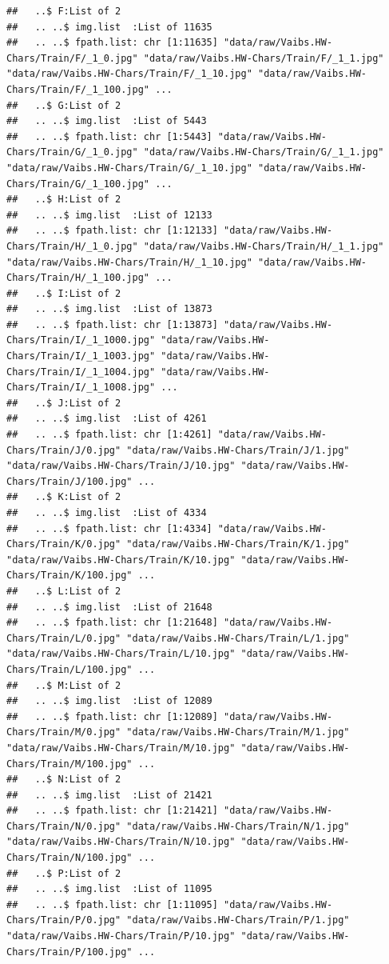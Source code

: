 \documentclass[
]{report}
\begin{document}
\begin{verbatim}
##   ..$ F:List of 2
##   .. ..$ img.list  :List of 11635
##   .. ..$ fpath.list: chr [1:11635] "data/raw/Vaibs.HW-Chars/Train/F/_1_0.jpg" "data/raw/Vaibs.HW-Chars/Train/F/_1_1.jpg" "data/raw/Vaibs.HW-Chars/Train/F/_1_10.jpg" "data/raw/Vaibs.HW-Chars/Train/F/_1_100.jpg" ...
##   ..$ G:List of 2
##   .. ..$ img.list  :List of 5443
##   .. ..$ fpath.list: chr [1:5443] "data/raw/Vaibs.HW-Chars/Train/G/_1_0.jpg" "data/raw/Vaibs.HW-Chars/Train/G/_1_1.jpg" "data/raw/Vaibs.HW-Chars/Train/G/_1_10.jpg" "data/raw/Vaibs.HW-Chars/Train/G/_1_100.jpg" ...
##   ..$ H:List of 2
##   .. ..$ img.list  :List of 12133
##   .. ..$ fpath.list: chr [1:12133] "data/raw/Vaibs.HW-Chars/Train/H/_1_0.jpg" "data/raw/Vaibs.HW-Chars/Train/H/_1_1.jpg" "data/raw/Vaibs.HW-Chars/Train/H/_1_10.jpg" "data/raw/Vaibs.HW-Chars/Train/H/_1_100.jpg" ...
##   ..$ I:List of 2
##   .. ..$ img.list  :List of 13873
##   .. ..$ fpath.list: chr [1:13873] "data/raw/Vaibs.HW-Chars/Train/I/_1_1000.jpg" "data/raw/Vaibs.HW-Chars/Train/I/_1_1003.jpg" "data/raw/Vaibs.HW-Chars/Train/I/_1_1004.jpg" "data/raw/Vaibs.HW-Chars/Train/I/_1_1008.jpg" ...
##   ..$ J:List of 2
##   .. ..$ img.list  :List of 4261
##   .. ..$ fpath.list: chr [1:4261] "data/raw/Vaibs.HW-Chars/Train/J/0.jpg" "data/raw/Vaibs.HW-Chars/Train/J/1.jpg" "data/raw/Vaibs.HW-Chars/Train/J/10.jpg" "data/raw/Vaibs.HW-Chars/Train/J/100.jpg" ...
##   ..$ K:List of 2
##   .. ..$ img.list  :List of 4334
##   .. ..$ fpath.list: chr [1:4334] "data/raw/Vaibs.HW-Chars/Train/K/0.jpg" "data/raw/Vaibs.HW-Chars/Train/K/1.jpg" "data/raw/Vaibs.HW-Chars/Train/K/10.jpg" "data/raw/Vaibs.HW-Chars/Train/K/100.jpg" ...
##   ..$ L:List of 2
##   .. ..$ img.list  :List of 21648
##   .. ..$ fpath.list: chr [1:21648] "data/raw/Vaibs.HW-Chars/Train/L/0.jpg" "data/raw/Vaibs.HW-Chars/Train/L/1.jpg" "data/raw/Vaibs.HW-Chars/Train/L/10.jpg" "data/raw/Vaibs.HW-Chars/Train/L/100.jpg" ...
##   ..$ M:List of 2
##   .. ..$ img.list  :List of 12089
##   .. ..$ fpath.list: chr [1:12089] "data/raw/Vaibs.HW-Chars/Train/M/0.jpg" "data/raw/Vaibs.HW-Chars/Train/M/1.jpg" "data/raw/Vaibs.HW-Chars/Train/M/10.jpg" "data/raw/Vaibs.HW-Chars/Train/M/100.jpg" ...
##   ..$ N:List of 2
##   .. ..$ img.list  :List of 21421
##   .. ..$ fpath.list: chr [1:21421] "data/raw/Vaibs.HW-Chars/Train/N/0.jpg" "data/raw/Vaibs.HW-Chars/Train/N/1.jpg" "data/raw/Vaibs.HW-Chars/Train/N/10.jpg" "data/raw/Vaibs.HW-Chars/Train/N/100.jpg" ...
##   ..$ P:List of 2
##   .. ..$ img.list  :List of 11095
##   .. ..$ fpath.list: chr [1:11095] "data/raw/Vaibs.HW-Chars/Train/P/0.jpg" "data/raw/Vaibs.HW-Chars/Train/P/1.jpg" "data/raw/Vaibs.HW-Chars/Train/P/10.jpg" "data/raw/Vaibs.HW-Chars/Train/P/100.jpg" ...

\end{verbatim}
\end{document}
